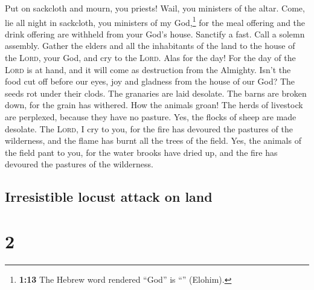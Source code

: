  Put on sackcloth and mourn, you priests! Wail, you
ministers of the altar. Come, lie all night in sackcloth, you ministers
of my God,\footnote{\textbf{1:13} The Hebrew word rendered ``God'' is
  ``'' (Elohim).} for the meal offering and the drink
offering are withheld from your God's house.  Sanctify a
fast. Call a solemn assembly. Gather the elders and all the inhabitants
of the land to the house of the \textsc{Lord}, your God, and cry to the
\textsc{Lord}.  Alas for the day! For the day of the
\textsc{Lord} is at hand, and it will come as destruction from the
Almighty.  Isn't the food cut off before our eyes, joy
and gladness from the house of our God?  The seeds rot
under their clods. The granaries are laid desolate. The barns are broken
down, for the grain has withered.  How the animals groan!
The herds of livestock are perplexed, because they have no pasture. Yes,
the flocks of sheep are made desolate.  The
\textsc{Lord}, I cry to you, for the fire has devoured the pastures of
the wilderness, and the flame has burnt all the trees of the field.
 Yes, the animals of the field pant to you, for the water
brooks have dried up, and the fire has devoured the pastures of the
wilderness.

\hypertarget{irresistible-locust-attack-on-land}{%
\subsection{Irresistible locust attack on
land}\label{irresistible-locust-attack-on-land}}

\hypertarget{section-1}{%
\section{2}\label{section-1}}

